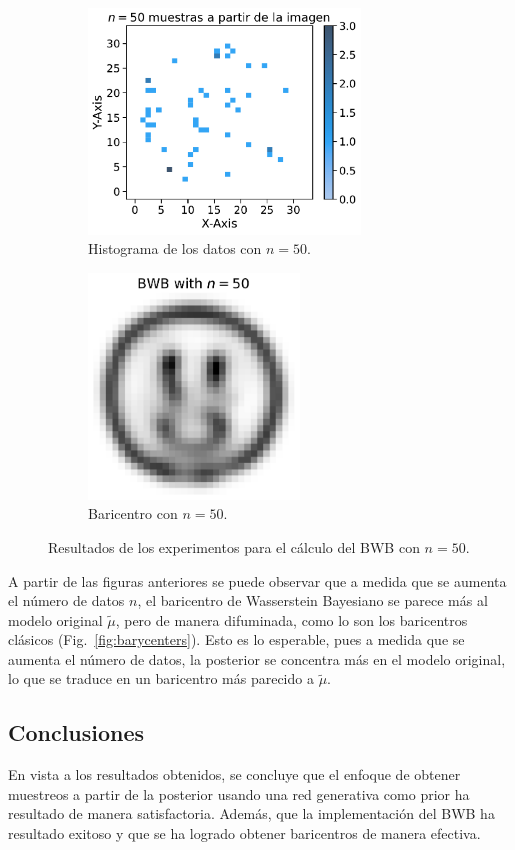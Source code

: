\begin{figure}[H]
    \begin{subfigure}[t]{0.49\textwidth}
        \centering
        \includegraphics[height=6cm]{img/bwb/samples-hist-n-50.pdf}
        \caption{Histograma de los datos con $n=50$.}
        \label{fig:samples-hist-n-50}
    \end{subfigure}
    \hfill
    \begin{subfigure}[t]{0.49\textwidth}
        \centering
        \includegraphics[height=6cm]{img/bwb/BWB-n-data-50.pdf}
        \caption{Baricentro con $n=50$.}
        \label{fig:bwb-n-data-50}
    \end{subfigure}
    \caption{Resultados de los experimentos para el cálculo del BWB con $n=50$.}
    \label{fig:bwb-experiments-n-50}
\end{figure}

A partir de las figuras anteriores se puede observar que a medida que se aumenta el número de datos $n$, el baricentro de Wasserstein Bayesiano se parece más al modelo original $\tilde\mu$, pero de manera difuminada, como lo son los baricentros clásicos (Fig.~\ref{fig:barycenters}). Esto es lo esperable, pues a medida que se aumenta el número de datos, la posterior se concentra más en el modelo original, lo que se traduce en un baricentro más parecido a $\tilde\mu$.


\subsection{Conclusiones}\label{ssec:bwb-conclusiones}  %

En vista a los resultados obtenidos, se concluye que el enfoque de obtener muestreos a partir de la posterior usando una red generativa como prior ha resultado de manera satisfactoria. Además, que la implementación del BWB ha resultado exitoso y que se ha logrado obtener baricentros de manera efectiva.
